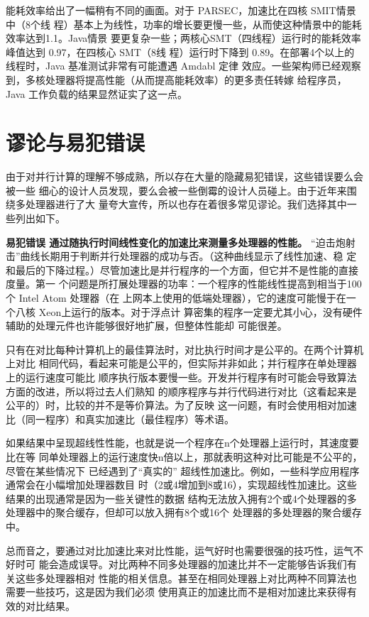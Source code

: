 能耗效率给出了一幅稍有不同的画面。对于 PARSEC，加速比在四核 SMIT情景中（8个线
程）基本上为线性，功率的增长要更慢一些，从而使这种情景中的能耗效率达到1.1。Java情景
要更复杂一些；两核心SMT（四线程）运行时的能耗效率峰值达到 0.97，在四核心 SMT（8线
程）运行时下降到 0.89。在部署4个以上的线程时，Java 基准测试非常有可能遭遇 Amdabl 定律
效应。一些架构师已经观察到，多核处理器将提高性能（从而提高能耗效率）的更多责任转嫁
给程序员，Java 工作负载的结果显然证实了这一点。

\section{谬论与易犯错误}
由于对并行计算的理解不够成熟，所以存在大量的隐藏易犯错误，这些错误要么会被一些
细心的设计人员发现，要么会被一些倒霉的设计人员碰上。由于近年来围绕多处理器进行了大
量夸大宣传，所以也存在着很多常见谬论。我们选择其中一些列出如下。

\textbf{易犯错误 通过随执行时间线性变化的加速比来测量多处理器的性能。}
“迫击炮射击”曲线长期用于判断并行处理器的成功与否。（这种曲线显示了线性加速、稳
定和最后的下降过程。）尽管加速比是并行程序的一个方面，但它并不是性能的直接度量。第一
个问题是所打展处理器的功率：一个程序的性能线性提高到相当于100个 Intel Atom 处理器（在
上网本上使用的低端处理器），它的速度可能慢于在一个八核 Xeon上运行的版本。对于浮点计
算密集的程序一定要尤其小心，没有硬件辅助的处理元件也许能够很好地扩展，但整体性能却
可能很差。

只有在对比每种计算机上的最佳算法时，对比执行时间才是公平的。在两个计算机上对比
相同代码，看起来可能是公平的，但实际并非如此；并行程序在单处理器上的运行速度可能比
顺序执行版本要慢一些。开发并行程序有时可能会导致算法方面的改进，所以将过去人们熟知
的顺序程序与并行代码进行对比（这看起来是公平的）时，比较的并不是等价算法。为了反映
这一问题，有时会使用相对加速比（同一程序）和真实加速比（最佳程序）等术语。

如果结果中呈现超线性性能，也就是说一个程序在n个处理器上运行时，其速度要比在等
同单处理器上的运行速度快n倍以上，那就表明这种对比可能是不公平的，尽管在某些情况下
已经遇到了“真实的” 超线性加速比。例如，一些科学应用程序通常会在小幅增加处理器数目
时（2或4增加到8或16），实现超线性加速比。这些结果的出现通常是因为一些关键性的数据
结构无法放入拥有2个或4个处理器的多处理器中的聚合缓存，但却可以放入拥有8个或16个
处理器的多处理器的聚合缓存中。

总而音之，要通过对比加速比来对比性能，运气好时也需要很强的技巧性，运气不好时可
能会造成误导。对比两种不同多处理器的加速比并不一定能够告诉我们有关这些多处理器相对
性能的相关信息。甚至在相同处理器上对比两种不同算法也需要一些技巧，这是因为我们必须
使用真正的加速比而不是相对加速比来获得有效的对比结果。

